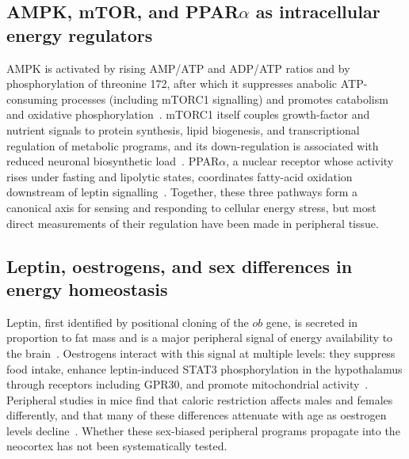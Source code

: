 \subsection{AMPK, mTOR, and PPAR$\alpha$ as intracellular energy regulators}
AMPK is activated by rising AMP/ATP and ADP/ATP ratios and by phosphorylation of threonine 172, after which it suppresses anabolic ATP-consuming processes (including mTORC1 signalling) and promotes catabolism and oxidative phosphorylation~\cite{steinberg2023ampk,ward2016ampk,su2019hsf1,yao2022ampk}. mTORC1 itself couples growth-factor and nutrient signals to protein synthesis, lipid biogenesis, and transcriptional regulation of metabolic programs, and its down-regulation is associated with reduced neuronal biosynthetic load~\cite{laplante2013mtorc1}. PPAR$\alpha$, a nuclear receptor whose activity rises under fasting and lipolytic states, coordinates fatty-acid oxidation downstream of leptin signalling~\cite{lopezdominguez2016omega3}. Together, these three pathways form a canonical axis for sensing and responding to cellular energy stress, but most direct measurements of their regulation have been made in peripheral tissue.

\subsection{Leptin, oestrogens, and sex differences in energy homeostasis}
Leptin, first identified by positional cloning of the $ob$ gene, is secreted in proportion to fat mass and is a major peripheral signal of energy availability to the brain~\cite{zhang1994positional}. Oestrogens interact with this signal at multiple levels: they suppress food intake, enhance leptin-induced STAT3 phosphorylation in the hypothalamus through receptors including GPR30, and promote mitochondrial activity~\cite{kwon2014gpr30,nestor2014crosstalk,elsehrawy2025eralpha}. Peripheral studies in mice find that caloric restriction affects males and females differently, and that many of these differences attenuate with age as oestrogen levels decline~\cite{lovdel2024hsd11b1,lopezdominguez2016omega3,greenfield2025lifespan,jeromson2024gdf15,ryu2023timerestricted}. Whether these sex-biased peripheral programs propagate into the neocortex has not been systematically tested.


